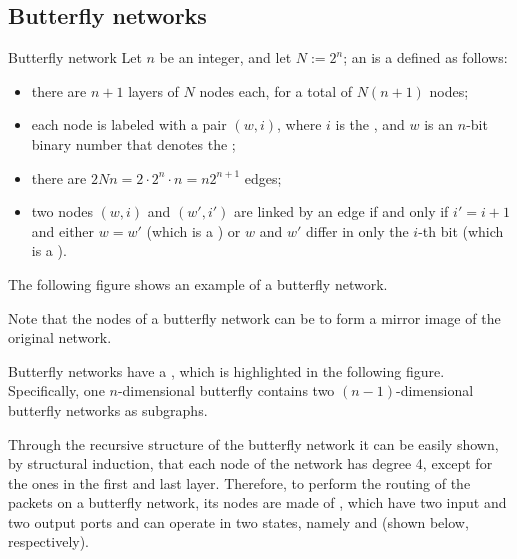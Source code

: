 \documentclass[a4paper, 12pt]{report}
\begin{document}
    \subsection{Butterfly networks} \label{butterfly_networks}

    \begin{frameddefn}{Butterfly network}
        Let $n$ be an integer, and let $N := 2^n$; an  is a  defined as follows:

        \begin{itemize}
            \item there are $n + 1$ layers of $N$ nodes each, for a total of $N(n + 1)$ nodes;
            \item each node is labeled with a pair $(w, i)$, where $i$ is the , and $w$ is an $n$-bit binary number that denotes the ;
            \item there are $2Nn = 2 \cdot 2^n \cdot n = n2^{n + 1}$ edges;
            \item two nodes $(w, i)$ and $(w', i')$ are linked by an edge if and only if $i' = i + 1$ and either $w = w'$ (which is a ) or $w$ and $w'$ differ in only the $i$-th bit (which is a ).
        \end{itemize}
    \end{frameddefn}

    \begin{example}
        The following figure shows an example of a butterfly network.

    \end{example}

    Note that the nodes of a butterfly network can be  to form a mirror image of the original network.

    Butterfly networks have a , which is highlighted in the following figure. Specifically, one $n$-dimensional butterfly contains two $(n - 1)$-dimensional butterfly networks as subgraphs.


    Through the recursive structure of the butterfly network it can be easily shown, by structural induction, that each node of the network has degree 4, except for the ones in the first and last layer. Therefore, to perform the routing of the packets on a butterfly network, its nodes are made of , which have two input and two output ports and can operate in two states, namely  and  (shown below, respectively).
\end{document}
